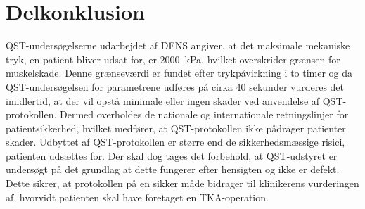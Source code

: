 \section{Delkonklusion}
QST-undersøgelserne udarbejdet af DFNS angiver, at det maksimale mekaniske tryk, en patient bliver udsat for, er 2000~kPa, hvilket overskrider grænsen for muskelskade. Denne grænseværdi er fundet efter trykpåvirkning i to timer og da QST-undersøgelsen for parametrene udføres på cirka 40 sekunder vurderes det imidlertid, at der vil opstå minimale eller ingen skader ved anvendelse af QST-protokollen. Dermed overholdes de nationale og internationale retningslinjer for patientsikkerhed, hvilket medfører, at QST-protokollen ikke pådrager patienter skader. Udbyttet af QST-protokollen er større end de sikkerhedsmæssige risici, patienten udsættes for. Der skal dog tages det forbehold, at QST-udstyret er undersøgt på det grundlag at dette fungerer efter hensigten og ikke er defekt. Dette sikrer, at protokollen på en sikker måde bidrager til klinikerens vurderingen af, hvorvidt patienten skal have foretaget en TKA-operation.
